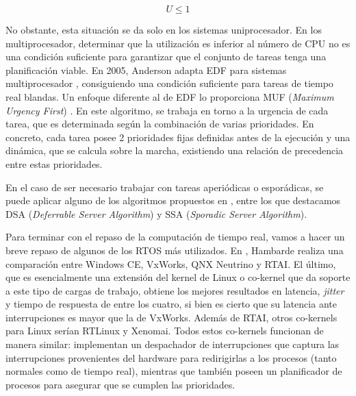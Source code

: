 \begin{equation}
  U \leq 1
\end{equation}

No obstante, esta situación se da solo en los sistemas uniprocesador. En los
multiprocesador, determinar que la utilización es inferior al número de CPU no
es una condición suficiente para garantizar que el conjunto de tareas tenga una
planificación viable. En 2005, Anderson adapta EDF para sistemas multiprocesador
\cite{anderson_edf-based_2005}, consiguiendo una condición suficiente para
tareas de tiempo real blandas. Un enfoque diferente al de EDF lo proporciona MUF
(\textit{Maximum Urgency First}) \cite{stewart_real-time_1991}. En este
algoritmo, se trabaja en torno a la urgencia de cada tarea, que es determinada
según la combinación de varias prioridades. En concreto, cada tarea posee 2
prioridades fijas definidas antes de la ejecución y una dinámica, que se calcula
sobre la marcha, existiendo una relación de precedencia entre estas prioridades.

En el caso de ser necesario trabajar con tareas aperiódicas o esporádicas, se
puede aplicar alguno de los algoritmos propuestos en
\cite{sprunt_scheduling_1989}, entre los que destacamos DSA (\textit{Deferrable
  Server Algorithm}) y SSA (\textit{Sporadic Server Algorithm}).

Para terminar con el repaso de la computación de tiempo real, vamos a hacer un
breve repaso de algunos de los RTOS más utilizados. En
\cite{hambarde_survey_2014}, Hambarde realiza una comparación entre Windows CE,
VxWorks, QNX Neutrino y RTAI. El último, que es esencialmente una extensión del
kernel de Linux o co-kernel que da soporte a este tipo de cargas de trabajo,
obtiene los mejores resultados en latencia, \textit{jitter} y tiempo de
respuesta de entre los cuatro, si bien es cierto que su latencia ante
interrupciones es mayor que la de VxWorks. Además de RTAI, otros co-kernels para
Linux serían RTLinux y Xenomai. Todos estos co-kernels funcionan de manera
similar: implementan un despachador de interrupciones que captura las
interrupciones provenientes del hardware para redirigirlas a los procesos (tanto
normales como de tiempo real), mientras que también poseen un planificador de
procesos para asegurar que se cumplen las prioridades.

